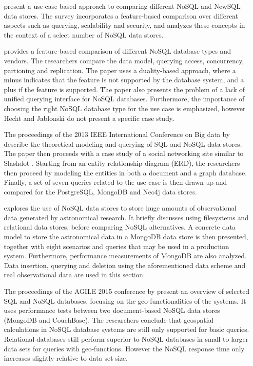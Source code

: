 \textcite{Grolinger2013} present a use-case based approach to comparing different NoSQL and NewSQL data stores.
The survey incorporates a feature-based comparison over different aspects such as querying, scalability and security, and analyzes these concepts in the context of a select number of NoSQL data stores.

\textcite{Hecht2011} provides a feature-based comparison of different NoSQL database types and vendors.
The researchers compare the data model, querying access, concurrency, partioning and replication.
The paper uses a duality-based approach, where a minus indicates that the feature is not supported by the database system, and a plus if the feature is supported.
The paper also presents the problem of a lack of unified querying interface for NoSQL databases.
Furthermore, the importance of choosing the right NoSQL database type for the use case is emphasized, however Hecht and Jablonski do not present a specific case study.

The proceedings of the 2013 IEEE International Conference on Big data by \textcite{Kaur2013} describe the theoretical modeling and querying of SQL and NoSQL data stores.
The paper then proceeds with a case study of a social networking site similar to Slashdot \autocite{Malda1997}.
Starting from an entity-relationship diagram (ERD), the researchers then proceed by modeling the entities in both a document and a graph database.
Finally, a set of seven queries related to the use case is then drawn up and compared for the PostgreSQL, MongoDB and Neo4j data stores.

\textcite{Zhao2015} explores the use of NoSQL data stores to store huge amounts of observational data generated by astronomical research.
It briefly discusses using filesystems and relational data stores, before comparing NoSQL alternatives.
A concrete data model to store the astronomical data in a MongoDB data store is then presented, together with eight scenarios and queries that may be used in a production system.
Furthermore, performance measurements of MongoDB are also analyzed.
Data insertion, querying and deletion using the aforementioned data scheme and real observational data are used in this section.

The proceedings of the AGILE 2015 conference by \textcite{Schmid2015} present an overview of selected SQL and NoSQL databases, focusing on the geo-functionalities of the systems.
It uses performance tests between two document-based NoSQL data stores (MongoDB and CouchBase).
The researchers conclude that geospatial calculations in NoSQL database systems are still only supported for basic queries.
Relational databases still perform superior to NoSQL databases in small to larger data sets for queries with geo-functions.
However the NoSQL response time only increases slightly relative to data set size.


